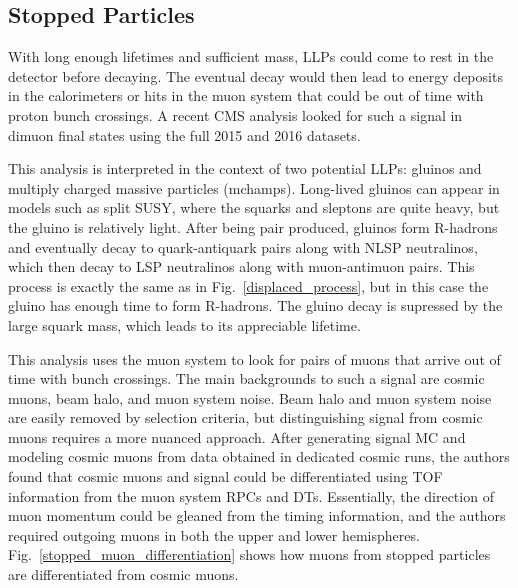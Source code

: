 \documentclass[12pt]{article}
\begin{document}
    \subsection{Stopped Particles}
        With long enough lifetimes and sufficient mass, LLPs could come to rest in the detector before decaying. The eventual decay would then lead to energy deposits in the calorimeters or hits in the muon system that could be out of time with proton bunch crossings. A recent CMS analysis looked for such a signal in dimuon final states using the full 2015 and 2016 datasets. 

        This analysis is interpreted in the context of two potential LLPs: gluinos and multiply charged massive particles (mchamps). Long-lived gluinos can appear in models such as split SUSY, where the squarks and sleptons are quite heavy, but the gluino is relatively light. After being pair produced, gluinos form R-hadrons and eventually decay to quark-antiquark pairs along with NLSP neutralinos, which then decay to LSP neutralinos along with muon-antimuon pairs. This process is exactly the same as in Fig.~\ref{displaced_process}, but in this case the gluino has enough time to form R-hadrons. The gluino decay is supressed by the large squark mass, which leads to its appreciable lifetime.

        This analysis uses the muon system to look for pairs of muons that arrive out of time with bunch crossings. The main backgrounds to such a signal are cosmic muons, beam halo, and muon system noise. Beam halo and muon system noise are easily removed by selection criteria, but distinguishing signal from cosmic muons requires a more nuanced approach. After generating signal MC and modeling cosmic muons from data obtained in dedicated cosmic runs, the authors found that cosmic muons and signal could be differentiated using TOF information from the muon system RPCs and DTs. Essentially, the direction of muon momentum could be gleaned from the timing information, and the authors required outgoing muons in both the upper and lower hemispheres. Fig.~\ref{stopped_muon_differentiation} shows how muons from stopped particles are differentiated from cosmic muons.
        
\end{document}
